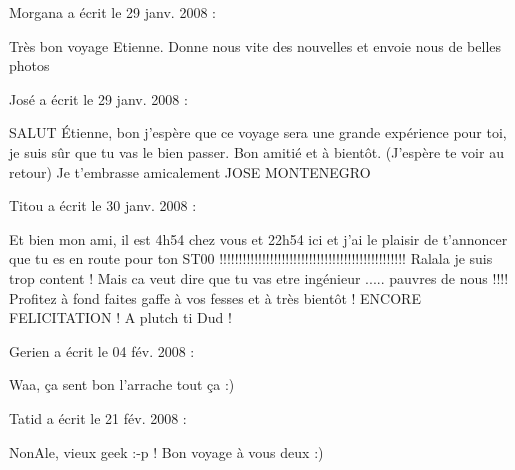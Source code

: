 \medskip
Morgana a écrit le 29 janv. 2008 :
\begin{displayquote}
Très bon voyage Etienne. Donne nous vite des nouvelles et envoie nous de belles photos
\end{displayquote}

\medskip
José a écrit le 29 janv. 2008 :
\begin{displayquote}
SALUT Étienne, bon j'espère que ce voyage sera une grande expérience pour toi, je suis sûr que tu vas le bien passer.
 Bon amitié et à bientôt. (J'espère te voir au retour)
 Je t'embrasse amicalement JOSE MONTENEGRO
\end{displayquote}

\medskip
Titou a écrit le 30 janv. 2008 :
\begin{displayquote}
Et bien mon ami, il est 4h54 chez vous et 22h54 ici et j'ai le plaisir de t'annoncer que tu es en route pour ton ST00 !!!!!!!!!!!!!!!!!!!!!!!!!!!!!!!!!!!!!!!!!!!!!!!! Ralala je suis trop content ! Mais ca veut dire que tu vas etre ingénieur ..... pauvres de nous !!!! Profitez à fond faites gaffe à vos fesses et à très bientôt ! ENCORE FELICITATION ! A plutch ti Dud !
\end{displayquote}

\medskip
Gerien a écrit le 04 fév. 2008 :
\begin{displayquote}
Waa, ça sent bon l'arrache tout ça :)
\end{displayquote}

\medskip
Tatid a écrit le 21 fév. 2008 :
\begin{displayquote}
NonAle, vieux geek :-p !
Bon voyage à vous deux :)
\end{displayquote}


